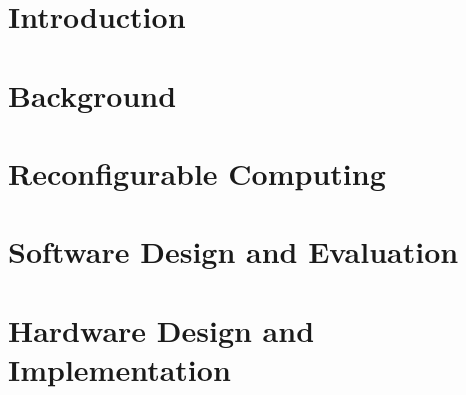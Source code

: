 \documentclass[a4paper]{report}
\newcommand{\blankpage}{%
    \newpage
    \thispagestyle{empty}%
    \mbox{}%
    \newpage
}
\begin{document}
\blankpage
{}

\chapter{Introduction}
\label{introduction}


\chapter{Background}
\label{background}


\chapter{Reconfigurable Computing}
\label{reconfigurableComputing}


\chapter{Software Design and Evaluation}
\label{software}


\chapter{Hardware Design and Implementation}
\label{hardware}

\end{document}
